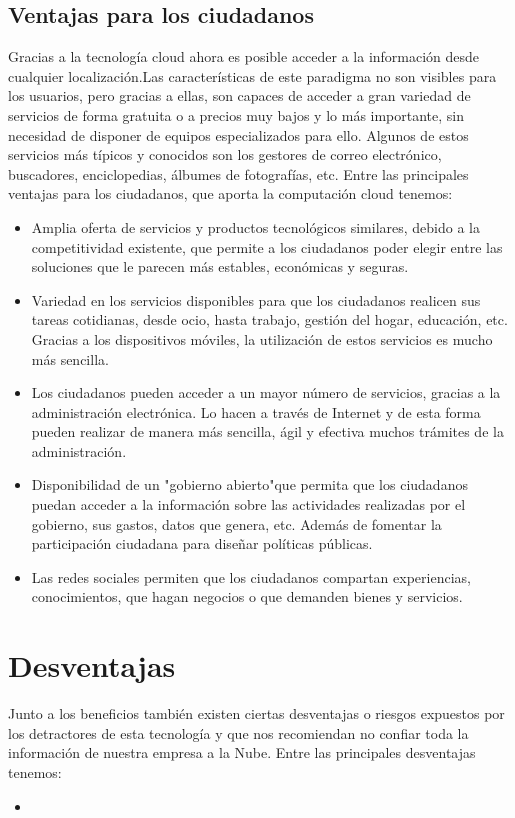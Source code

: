 \documentclass[a4paper, 12pt]{report}
\begin{document}
\subsection{Ventajas para los ciudadanos}
\begin{justify}
Gracias a la tecnolog\'ia cloud ahora es posible acceder a la informaci\'on desde cualquier localizaci\'on.Las caracter\'isticas de este paradigma no son visibles para los usuarios, pero gracias a ellas, son capaces de acceder a gran variedad de servicios de forma gratuita o a precios muy bajos y lo m\'as importante, sin necesidad de disponer de equipos especializados para ello. Algunos de estos servicios más t\'ipicos y conocidos son los gestores de correo electr\'onico, buscadores, enciclopedias, \'albumes de fotograf\'ias, etc.
Entre las principales ventajas para los ciudadanos, que aporta la computaci\'on cloud tenemos:
				\begin{itemize}
						\item{}Amplia oferta de servicios y productos tecnol\'ogicos similares, debido a la competitividad existente, que permite a los ciudadanos poder elegir entre las soluciones que le parecen m\'as estables, econ\'omicas y seguras.
						\item{}Variedad en los servicios disponibles para que los ciudadanos realicen sus tareas cotidianas, desde ocio, hasta trabajo, gesti\'on del hogar, educaci\'on, etc. Gracias a los dispositivos m\'oviles, la utilizaci\'on de estos servicios es mucho m\'as sencilla.
						\item{}Los ciudadanos pueden acceder a un mayor n\'umero de servicios, gracias a la administración electr\'onica. Lo hacen a trav\'es de Internet y de esta forma pueden realizar de manera m\'as sencilla, \'agil y efectiva muchos tr\'amites de la administraci\'on.
						\item{}Disponibilidad de un "gobierno abierto"\hspace{0.1cm}que permita que los ciudadanos puedan acceder a la informaci\'on sobre las actividades realizadas por el gobierno, sus gastos, datos que genera, etc. Además de fomentar la participaci\'on ciudadana para diseñar pol\'iticas p\'ublicas.
						\item{}Las redes sociales permiten que los ciudadanos compartan experiencias, conocimientos, que hagan negocios o que demanden bienes y servicios.
				\end{itemize}
\end{justify}
\newpage
\section{Desventajas}
\begin{justify}
Junto a los beneficios también existen ciertas desventajas o riesgos expuestos por los
detractores de esta tecnología y que nos recomiendan no confiar toda la información de nuestra empresa a la Nube.
Entre las principales desventajas tenemos:
				\begin{itemize}
						\item{}
				\end{itemize}
\end{justify}
\newpage
\end{document}
